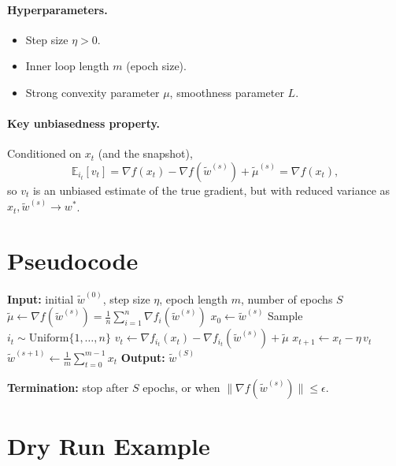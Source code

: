 \documentclass{article}
\begin{document}
\paragraph{Hyperparameters.}
\begin{itemize}
\item Step size $\eta > 0$.
\item Inner loop length $m$ (epoch size).
\item Strong convexity parameter $\mu$, smoothness parameter $L$.
\end{itemize}

\paragraph{Key unbiasedness property.}
Conditioned on $x_t$ (and the snapshot),
\[
\mathbb{E}_{i_t}[v_t] = \nabla f(x_t) - \nabla f(\tilde{w}^{(s)}) + \tilde{\mu}^{(s)} = \nabla f(x_t),
\]
so $v_t$ is an unbiased estimate of the true gradient, but with reduced variance as $x_t,\tilde{w}^{(s)} \to w^*$.

\section*{Pseudocode}

\begin{algorithm}[H]
\caption{SVRG (Strongly Convex)}
\begin{algorithmic}[1]
\State \textbf{Input:} initial $\tilde{w}^{(0)}$, step size $\eta$, epoch length $m$, number of epochs $S$
    \State $\tilde{\mu} \gets \nabla f(\tilde{w}^{(s)}) = \frac{1}{n}\sum_{i=1}^n \nabla f_i(\tilde{w}^{(s)})$ 
    \State $x_0 \gets \tilde{w}^{(s)}$
        \State Sample $i_t \sim \text{Uniform}\{1,\dots,n\}$
        \State $v_t \gets \nabla f_{i_t}(x_t) - \nabla f_{i_t}(\tilde{w}^{(s)}) + \tilde{\mu}$
        \State $x_{t+1} \gets x_t - \eta\, v_t$
    \EndFor
    \State $\tilde{w}^{(s+1)} \gets \frac{1}{m}\sum_{t=0}^{m-1} x_t$
\EndFor
\State \textbf{Output:} $\tilde{w}^{(S)}$
\end{algorithmic}
\end{algorithm}

\textbf{Termination:} stop after $S$ epochs, or when $\|\nabla f(\tilde{w}^{(s)})\| \le \epsilon$.

\section*{Dry Run Example}
\end{document}
